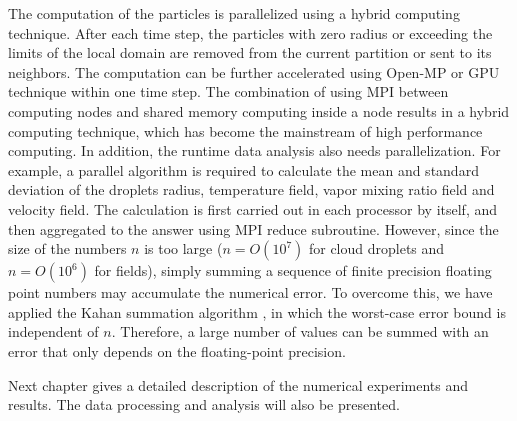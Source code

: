 The computation of the particles is parallelized using a hybrid computing technique. After each time step, the particles with zero radius or exceeding the limits of the local domain are removed from the current partition or sent to its neighbors. The computation can be further accelerated using Open-MP or GPU technique within one time step. The combination of using MPI between computing nodes and shared memory computing inside a node results in a hybrid computing technique, which has become the mainstream of high performance computing.
In addition, the runtime data analysis also needs parallelization. For example, a parallel algorithm is required to calculate the mean and standard deviation of the droplets radius, temperature field, vapor mixing ratio field and velocity field. The calculation is first carried out in each processor by itself, and then aggregated to the answer using MPI reduce subroutine. However, since the size of the numbers $n$ is too large ($n = O(10^7)$ for cloud droplets and $n = O(10^6)$ for fields), simply summing a sequence of finite precision floating point numbers may accumulate the numerical error. To overcome this, we have applied the Kahan summation algorithm \cite{Kahan1965Pracniques}, in which the worst-case error bound is independent of $n$. Therefore, a large number of values can be summed with an error that only depends on the floating-point precision. 

Next chapter gives a detailed description of the numerical experiments and results. The data processing and analysis will also be presented.
\newpage{}
